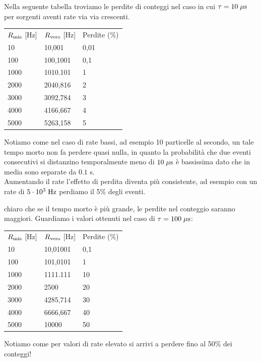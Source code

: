 \begin{esempio}
   Nella seguente tabella troviamo le perdite di conteggi nel caso in cui $\tau=10 \; \rm \mu s$ per sorgenti aventi rate via via crescenti.
   \begin{center}
      \begin{tabular}{p{2cm}p{3cm}p{2.5cm}}
         $R_{\rm mis}$ [Hz] & $R_{\rm vero}$ [Hz] & Perdite (\%)\\
         10 & 10,001 & 0,01\\
         100 & 100,1001 & 0,1\\
         1000 & 1010.101 & 1\\
         2000 & 2040,816 & 2\\
         3000 & 3092,784 & 3\\
         4000 & 4166,667 & 4\\
         5000 & 5263,158 & 5
      \end{tabular}
   \end{center}
   Notiamo come nel caso di rate bassi, ad esempio 10 particelle al secondo, un tale tempo morto non fa perdere quasi nulla, in quanto la probabilità che due eventi consecutivi si distanzino temporalmente meno di $10 \; \rm \mu s$ è bassissima dato che in media sono separate da $0.1$ s.\\
   Aumentando il rate l'effetto di perdita diventa più consistente, ad esempio con un rate di $5 \cdot 10^3 \; \rm Hz$ perdiamo il 5\% degli eventi.
\end{esempio}

\begin{esempio}
   \E chiaro che se il tempo morto è più grande, le perdite nel conteggio saranno maggiori. Guardiamo i valori ottenuti nel caso di $\tau=100 \; \rm \mu s$:
   \begin{center}
      \begin{tabular}{p{2cm}p{3cm}p{2.5cm}}
         $R_{\rm mis}$ [Hz] & $R_{\rm vero}$ [Hz] & Perdite (\%)\\
         10 & 10,01001 & 0,1\\
         100 & 101,0101 & 1\\
         1000 & 1111.111 & 10\\
         2000 & 2500 & 20\\
         3000 & 4285,714 & 30\\
         4000 & 6666,667 & 40\\
         5000 & 10000 & 50
      \end{tabular}
   \end{center}
   Notiamo come per valori di rate elevato si arrivi a perdere fino al 50\% dei conteggi!
\end{esempio}

